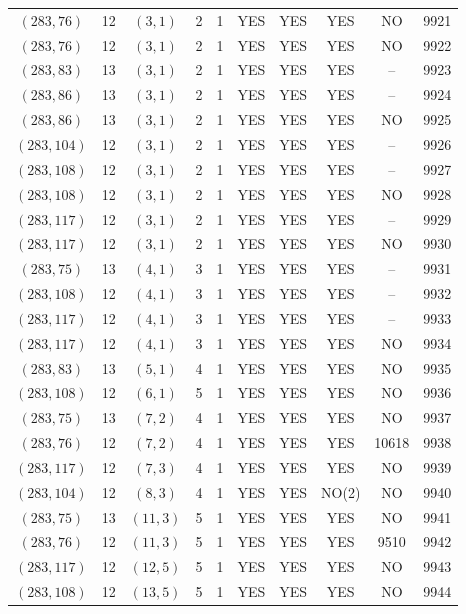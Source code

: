 \begin{longtable}{|c|c|c|c|c|c|c|c|c|c|}
$(283, 76)$ & 12 & $(3, 1)$ & 2 & 1 & YES & YES & YES & NO & 9921\\
$(283, 76)$ & 12 & $(3, 1)$ & 2 & 1 & YES & YES & YES & NO & 9922\\
$(283, 83)$ & 13 & $(3, 1)$ & 2 & 1 & YES & YES & YES & -- & 9923\\
$(283, 86)$ & 13 & $(3, 1)$ & 2 & 1 & YES & YES & YES & -- & 9924\\
$(283, 86)$ & 13 & $(3, 1)$ & 2 & 1 & YES & YES & YES & NO & 9925\\
$(283, 104)$ & 12 & $(3, 1)$ & 2 & 1 & YES & YES & YES & -- & 9926\\
$(283, 108)$ & 12 & $(3, 1)$ & 2 & 1 & YES & YES & YES & -- & 9927\\
$(283, 108)$ & 12 & $(3, 1)$ & 2 & 1 & YES & YES & YES & NO & 9928\\
$(283, 117)$ & 12 & $(3, 1)$ & 2 & 1 & YES & YES & YES & -- & 9929\\
$(283, 117)$ & 12 & $(3, 1)$ & 2 & 1 & YES & YES & YES & NO & 9930\\
$(283, 75)$ & 13 & $(4, 1)$ & 3 & 1 & YES & YES & YES & -- & 9931\\
$(283, 108)$ & 12 & $(4, 1)$ & 3 & 1 & YES & YES & YES & -- & 9932\\
$(283, 117)$ & 12 & $(4, 1)$ & 3 & 1 & YES & YES & YES & -- & 9933\\
$(283, 117)$ & 12 & $(4, 1)$ & 3 & 1 & YES & YES & YES & NO & 9934\\
$(283, 83)$ & 13 & $(5, 1)$ & 4 & 1 & YES & YES & YES & NO & 9935\\
$(283, 108)$ & 12 & $(6, 1)$ & 5 & 1 & YES & YES & YES & NO & 9936\\
$(283, 75)$ & 13 & $(7, 2)$ & 4 & 1 & YES & YES & YES & NO & 9937\\
$(283, 76)$ & 12 & $(7, 2)$ & 4 & 1 & YES & YES & YES & 10618 & 9938\\
$(283, 117)$ & 12 & $(7, 3)$ & 4 & 1 & YES & YES & YES & NO & 9939\\
$(283, 104)$ & 12 & $(8, 3)$ & 4 & 1 & YES & YES & NO(2) & NO & 9940\\
$(283, 75)$ & 13 & $(11, 3)$ & 5 & 1 & YES & YES & YES & NO & 9941\\
$(283, 76)$ & 12 & $(11, 3)$ & 5 & 1 & YES & YES & YES & 9510 & 9942\\
$(283, 117)$ & 12 & $(12, 5)$ & 5 & 1 & YES & YES & YES & NO & 9943\\
$(283, 108)$ & 12 & $(13, 5)$ & 5 & 1 & YES & YES & YES & NO & 9944\\

\end{longtable}
